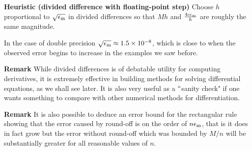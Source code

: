 \textbf{Heuristic (divided difference with floating-point step)} Choose $h$ proportional to $\sqrt{\ensuremath{\epsilon}_{\rm m}}$ in divided differences  so that $M h$ and ${4c \ensuremath{\epsilon}_{\rm m} \over h}$ are roughly the same magnitude.

In the case of double precision $\sqrt{\ensuremath{\epsilon}_{\rm m}} \ensuremath{\approx} 1.5\ensuremath{\times} 10^{-8}$, which is close to when the observed error begins to increase in the examples we saw before. 

\textbf{Remark} While divided differences is of debatable utility for computing derivatives, it is extremely effective in building methods for solving differential equations, as we shall see later. It is also very useful as a \ensuremath{\ldq}sanity check" if one wants something to compare with other numerical methods for differentiation.

\textbf{Remark} It is also possible to deduce an error bound for the rectangular rule showing that the error caused by round-off is on the order of $n \ensuremath{\epsilon}_{\rm m}$, that is it does in fact grow but the error without round-off which was bounded by $M/n$ will be substantially greater for all reasonable values of $n$. 



